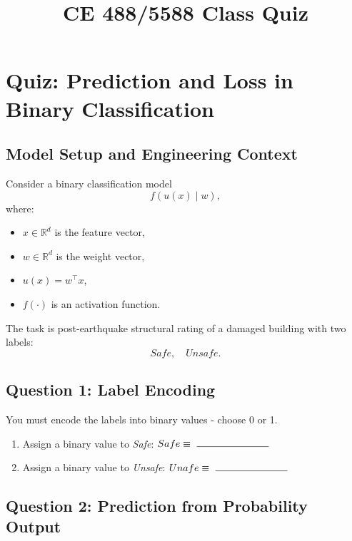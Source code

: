 \documentclass[12pt]{article}
\begin{document}
\title{CE 488/5588 Class Quiz\\
\vspace{2in}
\author{}
}
\maketitle

\doublespacing
\newcommand*{\I}{\imath} %

\newpage
\section*{Quiz: Prediction and Loss in Binary Classification}

\subsection*{Model Setup and Engineering Context}

Consider a binary classification model
\[
f(u(x)\mid w),
\]
where:
\begin{itemize}
    \item $x \in \mathbb{R}^d$ is the feature vector,
    \item $w \in \mathbb{R}^d$ is the weight vector,
    \item $u(x) = w^\top x$,
    \item $f(\cdot)$ is an activation function.
\end{itemize}

The task is post-earthquake structural rating of a damaged building with two labels:
\[
\textit{Safe}, \quad \textit{Unsafe}.
\]

\subsection*{Question 1: Label Encoding}

You must encode the labels into binary values - choose 0 or 1. 

\begin{enumerate}
    \item[(a)] Assign a binary value to \textit{Safe}: $Safe \equiv\ \FillRule{1in}$
    \item[(b)] Assign a binary value to \textit{Unsafe}: $Unafe \equiv\ \FillRule{1in}$
\end{enumerate}

\subsection*{Question 2: Prediction from Probability Output}
\end{document}
